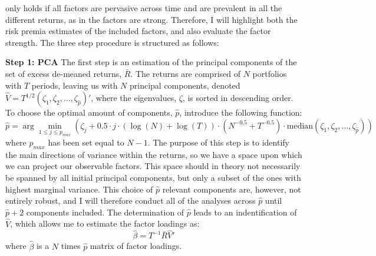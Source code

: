 \cite{giglio2021asset} only holds if all factors are pervasive across time and are prevalent in all the different returns, as in the factors are strong. Therefore, I will highlight both the risk premia estimates of the included factors, and also evaluate the factor strength. The three step procedure is structured as follows: 

\textbf{Step 1: PCA} The first step is an estimation of the principal components of the set of excess de-meaned returns, $\bar{R}$. The returns are comprised of $N$ portfolios with $T$ periods, leaving us with $N$ principal components, denoted $\hat{V} = T^{1/2} \left( \zeta_{1}, \zeta_{2}, \ldots, \zeta_{\hat{p}} \right)'$, where the eigenvalues, $\zeta$, is sorted in descending order. To choose the optimal amount of components, $\hat{p}$, \cite{giglio2021asset} introduce the following function:
\begin{equation}
	\hat{p}=\arg\min_{1\leq j\leq p_{max}} \left(   \zeta_{j} + 0.5\cdot j \cdot \left( \log(N) + \log(T) \right) \cdot \left( N^{-0.5} + T^{-0.5} \right) \cdot \text{median} \left( \zeta_{1}, \zeta_{2}, \ldots, \zeta_{\hat{p}} \right) \right)
	\label{eq:tp_cost}
\end{equation}
where $p_{max}$ has been set equal to $N-1$. The purpose of this step is to identify the main directions of variance within the returns, so we have a space upon which we can project our observable factors. This space should in theory not necessarily be spanned by all initial principal components, but only a subset of the ones with highest marginal variance. This choice of $\hat{p}$ relevant components are, however, not entirely robust, and I will therefore conduct all of the analyses across $\hat{p}$ until $\hat{p}+2$ components included. The determination of $\hat{p}$ leads to an indentification of $\hat{V}$, which allows me to estimate the factor loadings as:
\begin{equation}
	\hat{\beta} = T^{-1}\bar{R}\hat{V}'
	\label{eq:tp_1_beta}
\end{equation}
where $\hat{\beta}$ is a $N$ times $\hat{p}$ matrix of factor loadings. 

